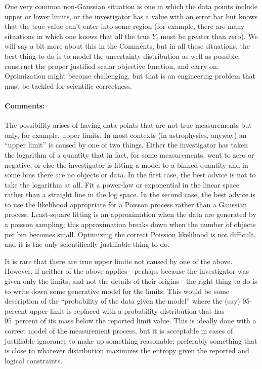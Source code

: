 \documentclass[12pt,twoside]{article}
\newcommand{\commentsname}{Comments}
\newcounter{problem}
\newenvironment{comments}{\paragraph{\commentsname:}}{}
\begin{document}
One very common non-Gaussian situation is one in which the data points
include upper or lower limits, or the investigator has a value with an
error bar but knows that the true value can't enter into some region
(for example, there are many situations in which one knows that all
the true $Y_i$ must be greater than zero).  We will say a bit more
about this in the \commentsname, but in all these situations, the best
thing to do is to model the uncertainty distribution as well as
possible, construct the proper justified scalar objective function,
and carry on.  Optimization might become challenging, but that is an
engineering problem that must be tackled for scientific correctness.

\begin{comments}
The possibility arises of having data points that are not true
measurements but only, for example, upper limits.  In most contexts
(in astrophysics, anyway) an ``upper limit'' is caused by one of two
things.  Either the investigator has taken the logarithm of a quantity
that in fact, for some measurements, went to zero or negative; or else
the investigator is fitting a model to a binned quantity and in some
bins there are no objects or data.  In the first case, the best advice
is not to take the logarithm at all.  Fit a power-law or exponential
in the linear space rather than a straight line in the log space.  In
the second case, the best advice is to use the likelihood appropriate
for a Poisson process rather than a Gaussian process.  Least-square
fitting is an approximation when the data are generated by a poisson
sampling; this approximation breaks down when the number of objects
per bin becomes small.  Optimizing the correct Poission likelihood is
not difficult, and it is the only scientifically justifiable thing to
do.

It is rare that there are true upper limits not caused by one of the
above.  However, if neither of the above applies---perhaps because the
investigator was given only the limits, and not the details of their
origins---the right thing to do is to write down some generative model
for the limits.  This would be some description of the ``probability
of the data given the model'' where the (say) 95-percent upper limit
is replaced with a probability distribution that has 95~percent of its
mass below the reported limit value.  This is ideally done with a
correct model of the measurement process, but it is acceptable in
cases of justifiable ignorance to make up something reasonable;
preferably something that is close to whatever distribution maximizes
the entropy given the reported and logical constraints.
\end{comments}
\end{document}
